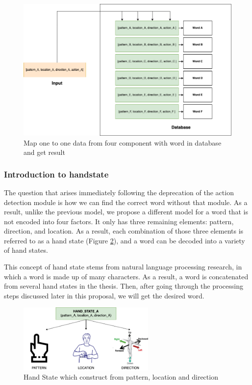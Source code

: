 \begin{figure}[H]
	\centering
	\includegraphics[width=\textwidth]{img/Chap4/MapWord.png}
	\caption{Map one to one data from four component with word in database and get result}
	\label{fig:Chap4-MapWord}
\end{figure}

\subsubsection{ Introduction to handstate }\label{sec:handstate}

The question that arises immediately following the deprecation of the action detection module is how we can find the correct word without that module. As a result, unlike the previous model, we propose a different model for a word that is not encoded into four factors. It only has three remaining elements: pattern, direction, and location. As a result, each combination of those three elements is referred to as a hand state (Figure \ref{fig:Chap4-HandState}), and a word can be decoded into a variety of hand states.

This concept of hand state stems from natural language processing research, in which a word is made up of many characters. As a result, a word is concatenated from several hand states in the thesis. Then, after going through the processing steps discussed later in this proposal, we will get the desired word.

\begin{figure}[H]
  \centering
  \includegraphics[width=0.6\textwidth]{img/Chap4/HandState.png}
  \caption{ Hand State which construct from pattern, location and direction}
  \label{fig:Chap4-HandState}
\end{figure}

